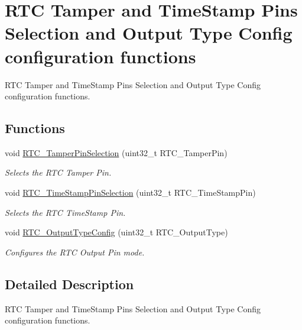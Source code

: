 \hypertarget{group___r_t_c___group11}{}\section{R\+T\+C Tamper and Time\+Stamp Pins Selection and Output Type Config configuration functions}
\label{group___r_t_c___group11}


R\+T\+C Tamper and Time\+Stamp Pins Selection and Output Type Config configuration functions.  


\subsection*{Functions}
\begin{DoxyCompactItemize}
\item 
void \hyperlink{group___r_t_c___group11_ga46777272ae77eb9dc38610481e12b0ed}{R\+T\+C\+\_\+\+Tamper\+Pin\+Selection} (uint32\+\_\+t R\+T\+C\+\_\+\+Tamper\+Pin)
\begin{DoxyCompactList}\small\item\em Selects the R\+T\+C Tamper Pin. \end{DoxyCompactList}\item 
void \hyperlink{group___r_t_c___group11_gaedf9830bdaaaa50ea5d45d2ff7bb43a9}{R\+T\+C\+\_\+\+Time\+Stamp\+Pin\+Selection} (uint32\+\_\+t R\+T\+C\+\_\+\+Time\+Stamp\+Pin)
\begin{DoxyCompactList}\small\item\em Selects the R\+T\+C Time\+Stamp Pin. \end{DoxyCompactList}\item 
void \hyperlink{group___r_t_c___group11_ga95263b7acf7168d52f66ef9121f14760}{R\+T\+C\+\_\+\+Output\+Type\+Config} (uint32\+\_\+t R\+T\+C\+\_\+\+Output\+Type)
\begin{DoxyCompactList}\small\item\em Configures the R\+T\+C Output Pin mode. \end{DoxyCompactList}\end{DoxyCompactItemize}


\subsection{Detailed Description}
R\+T\+C Tamper and Time\+Stamp Pins Selection and Output Type Config configuration functions. 

